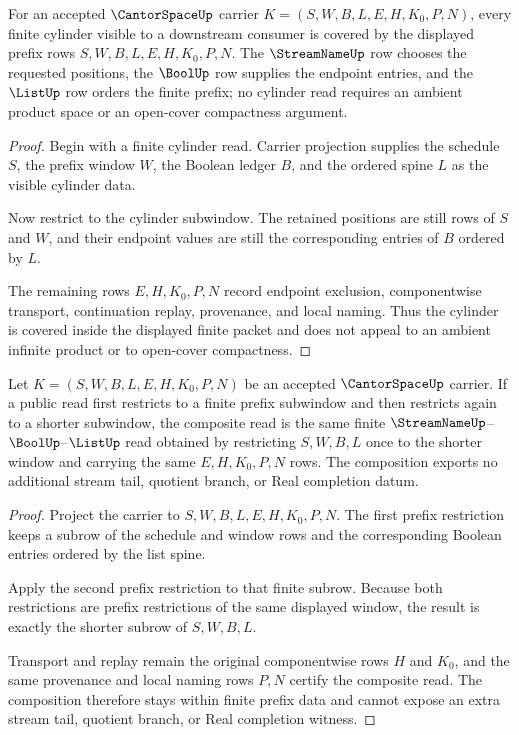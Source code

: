 \begin{theorem}
\label{thm:cantor-space-cylinder-coverage}
For an accepted $\CantorSpaceUp$ carrier
$K=(S,W,B,L,E,H,K_0,P,N)$, every finite cylinder visible to a downstream
consumer is covered by the displayed prefix rows $S,W,B,L,E,H,K_0,P,N$. The
$\StreamNameUp$ row chooses the requested positions, the $\BoolUp$ row supplies
the endpoint entries, and the $\ListUp$ row orders the finite prefix; no
cylinder read requires an ambient product space or an open-cover compactness
argument.
\end{theorem}
\begin{proof}
Begin with a finite cylinder read. Carrier projection supplies the schedule
$S$, the prefix window $W$, the Boolean ledger $B$, and the ordered spine $L$
as the visible cylinder data.

Now restrict to the cylinder subwindow. The retained positions are still rows
of $S$ and $W$, and their endpoint values are still the corresponding entries
of $B$ ordered by $L$.

The remaining rows $E,H,K_0,P,N$ record endpoint exclusion, componentwise
transport, continuation replay, provenance, and local naming. Thus the
cylinder is covered inside the displayed finite packet and does not appeal to
an ambient infinite product or to open-cover compactness.
\end{proof}

\begin{theorem}
\label{thm:cantor-space-prefix-window-composition}
Let $K=(S,W,B,L,E,H,K_0,P,N)$ be an accepted $\CantorSpaceUp$ carrier. If a
public read first restricts to a finite prefix subwindow and then restricts
again to a shorter subwindow, the composite read is the same finite
$\StreamNameUp$--$\BoolUp$--$\ListUp$ read obtained by restricting $S,W,B,L$
once to the shorter window and carrying the same $E,H,K_0,P,N$ rows. The
composition exports no additional stream tail, quotient branch, or Real
completion datum.
\end{theorem}
\begin{proof}
Project the carrier to $S,W,B,L,E,H,K_0,P,N$. The first prefix restriction
keeps a subrow of the schedule and window rows and the corresponding Boolean
entries ordered by the list spine.

Apply the second prefix restriction to that finite subrow. Because both
restrictions are prefix restrictions of the same displayed window, the result
is exactly the shorter subrow of $S,W,B,L$.

Transport and replay remain the original componentwise rows $H$ and $K_0$, and
the same provenance and local naming rows $P,N$ certify the composite read.
The composition therefore stays within finite prefix data and cannot expose an
extra stream tail, quotient branch, or Real completion witness.
\end{proof}

